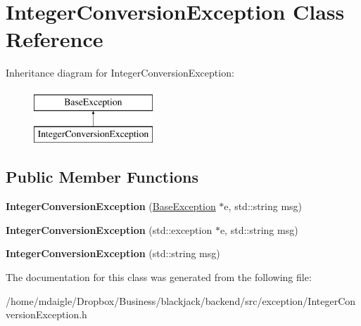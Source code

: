 \hypertarget{classIntegerConversionException}{
\section{\-Integer\-Conversion\-Exception \-Class \-Reference}
\label{d2/dd6/classIntegerConversionException}
}
\-Inheritance diagram for \-Integer\-Conversion\-Exception\-:\begin{figure}[H]
\begin{center}
\leavevmode
\includegraphics[height=2.000000cm]{d2/dd6/classIntegerConversionException}
\end{center}
\end{figure}
\subsection*{\-Public \-Member \-Functions}
\begin{DoxyCompactItemize}
\item 
\hypertarget{classIntegerConversionException_aa4c051dc648b6728e17841432596b081}{
{\bfseries \-Integer\-Conversion\-Exception} (\hyperlink{classBaseException}{\-Base\-Exception} $\ast$e, std\-::string msg)}
\label{d2/dd6/classIntegerConversionException_aa4c051dc648b6728e17841432596b081}

\item 
\hypertarget{classIntegerConversionException_ad35d2d51c3808e79e61ef9afb818c667}{
{\bfseries \-Integer\-Conversion\-Exception} (std\-::exception $\ast$e, std\-::string msg)}
\label{d2/dd6/classIntegerConversionException_ad35d2d51c3808e79e61ef9afb818c667}

\item 
\hypertarget{classIntegerConversionException_aa6be7fa941c0ebdd3354ceabcf3e8f94}{
{\bfseries \-Integer\-Conversion\-Exception} (std\-::string msg)}
\label{d2/dd6/classIntegerConversionException_aa6be7fa941c0ebdd3354ceabcf3e8f94}

\end{DoxyCompactItemize}


\-The documentation for this class was generated from the following file\-:\begin{DoxyCompactItemize}
\item 
/home/mdaigle/\-Dropbox/\-Business/blackjack/backend/src/exception/\-Integer\-Conversion\-Exception.\-h\end{DoxyCompactItemize}
